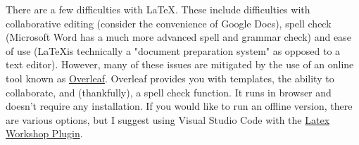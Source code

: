 There are a few difficulties with \LaTeX. These include difficulties with collaborative editing (consider the convenience of Google Docs), spell check (Microsoft Word has a much more advanced spell and grammar check) and ease of use (\LaTeX is technically a "document preparation system" as opposed to a text editor). However, many of these issues are mitigated by the use of an online tool known as \href{https://www.overleaf.com}{Overleaf}. Overleaf provides you with templates, the ability to collaborate, and (thankfully), a spell check function. It runs in browser and doesn't require any installation. If you would like to run an offline version, there are various options, but I suggest using Visual Studio Code with the \href{https://github.com/James-Yu/LaTeX-Workshop/wiki/Install}{Latex Workshop Plugin}.
